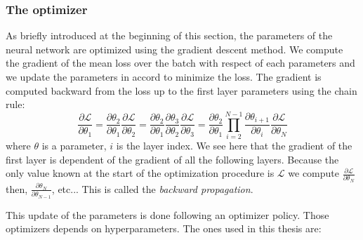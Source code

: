 \documentclass[../main.tex]{subfiles}
\begin{document}
\subsubsection{The optimizer}
\label{sec:ml:optim}

As briefly introduced at the beginning of this section, the parameters of the neural network are optimized using the gradient descent method. We compute the gradient of the mean loss over the batch with respect of each parameters and we update the parameters in accord to minimize the loss. The  gradient is computed backward from the loss up to the first layer parameters using the chain rule:
\begin{equation}
  \label{eq:ml:backward}
  \frac{\partial \mathcal{L}}{\partial \theta_1} = \frac{\partial \theta_2}{\partial \theta_1} \frac{\partial \mathcal{L}}{\partial \theta_2} = \frac{\partial \theta_2}{\partial \theta_1} \frac{\partial \theta_3}{\partial \theta_2} \frac{\partial \mathcal{L}}{\partial \theta_3} = \frac{\partial \theta_2}{\partial \theta_1} \prod_{i=2}^{N-1} \frac{\partial \theta_{i+1}}{\partial \theta_i} \frac{\partial \mathcal{L}}{\partial \theta_N}
\end{equation}
where $\theta$ is a parameter, $i$ is the layer index. We see here that the gradient of the first layer is dependent of the gradient of all the following layers. Because the only value known at the start of the optimization procedure is $\mathcal{L}$ we compute $\frac{\partial \mathcal{L}}{\partial \theta_N}$ then, $\frac{\partial \theta_{N}}{\partial \theta_{N-1}}$, etc... This is called the \textit{backward propagation}.

This update of the parameters is done following an optimizer policy. Those optimizers depends on hyperparameters. The ones used in this thesis are:
\end{document}
